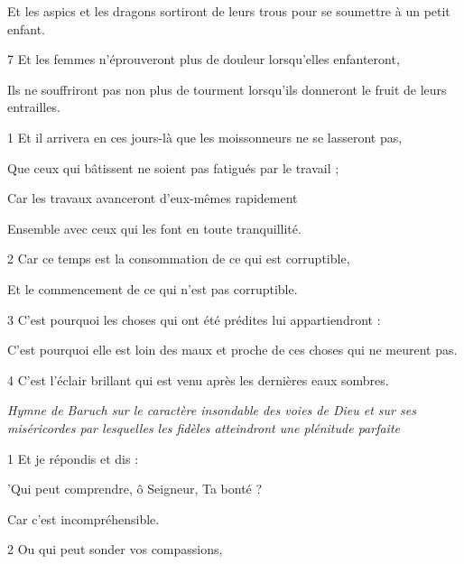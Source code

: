 \par Et les aspics et les dragons sortiront de leurs trous pour se soumettre à un petit enfant.

\par 7 Et les femmes n'éprouveront plus de douleur lorsqu'elles enfanteront,

\par Ils ne souffriront pas non plus de tourment lorsqu'ils donneront le fruit de leurs entrailles.


\par 1 Et il arrivera en ces jours-là que les moissonneurs ne se lasseront pas,

\par Que ceux qui bâtissent ne soient pas fatigués par le travail ;

\par Car les travaux avanceront d'eux-mêmes rapidement

\par Ensemble avec ceux qui les font en toute tranquillité.

\par 2 Car ce temps est la consommation de ce qui est corruptible,

\par Et le commencement de ce qui n'est pas corruptible.

\par 3 C'est pourquoi les choses qui ont été prédites lui appartiendront :

\par C'est pourquoi elle est loin des maux et proche de ces choses qui ne meurent pas.

\par 4 C'est l'éclair brillant qui est venu après les dernières eaux sombres.


\par \textit{Hymne de Baruch sur le caractère insondable des voies de Dieu et sur ses miséricordes par lesquelles les fidèles atteindront une plénitude parfaite}

\par 1 Et je répondis et dis :

\par 'Qui peut comprendre, ô Seigneur, Ta bonté ?

\par Car c'est incompréhensible.

\par 2 Ou qui peut sonder vos compassions,

